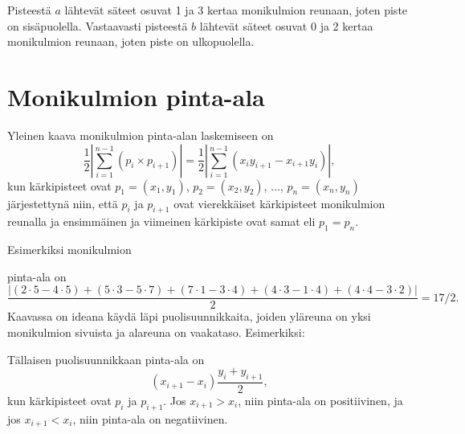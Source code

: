 Pisteestä $a$ lähtevät säteet osuvat 1 ja 3
kertaa monikulmion reunaan,
joten piste on sisäpuolella.
Vastaavasti pisteestä $b$ lähtevät
säteet osuvat 0 ja 2 kertaa monikulmion reunaan,
joten piste on ulkopuolella.

\section{Monikulmion pinta-ala}

Yleinen kaava monikulmion pinta-alan laskemiseen on
\[\frac{1}{2} |\sum_{i=1}^{n-1} (p_i \times p_{i+1})| =
\frac{1}{2} |\sum_{i=1}^{n-1} (x_i y_{i+1} - x_{i+1} y_i)|, \]
kun kärkipisteet ovat
$p_1=(x_1,y_1)$, $p_2=(x_2,y_2)$, $\ldots$, $p_n=(x_n,y_n)$
järjestettynä niin,
että $p_i$ ja $p_{i+1}$ ovat vierekkäiset kärkipisteet
monikulmion reunalla
ja ensimmäinen ja viimeinen kärkipiste ovat samat eli $p_1=p_n$.

Esimerkiksi monikulmion
\begin{center}
\end{center}
pinta-ala on
\[\frac{|(2\cdot5-4\cdot5)+(5\cdot3-5\cdot7)+(7\cdot1-3\cdot4)+(4\cdot3-1\cdot4)+(4\cdot4-3\cdot2)|}{2} = 17/2.\]
Kaavassa on ideana käydä läpi puolisuunnikkaita,
joiden yläreuna on yksi monikulmion sivuista ja
alareuna on vaakataso. Esimerkiksi:
\begin{center}
\end{center}
Tällaisen puolisuunnikkaan pinta-ala on
\[(x_{i+1}-x_{i}) \frac{y_i+y_{i+1}}{2},\]
kun kärkipisteet ovat $p_i$ ja $p_{i+1}$.
Jos $x_{i+1}>x_{i}$, niin pinta-ala on positiivinen,
ja jos $x_{i+1}<x_{i}$, niin pinta-ala on negatiivinen.

